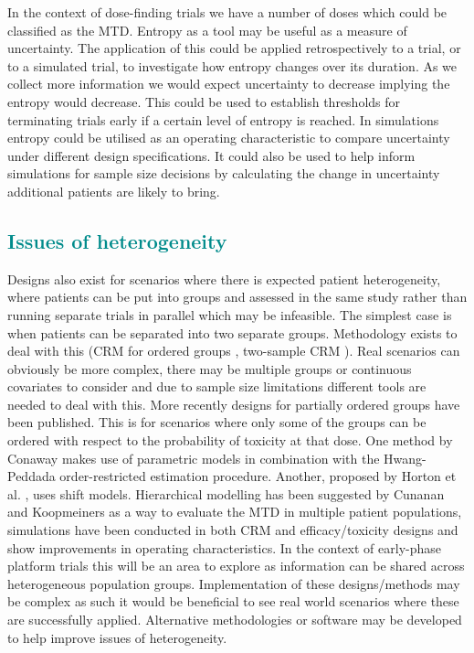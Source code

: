 \documentclass[a4paper, 11pt]{article} %
\begin{document}
\noindent In the context of dose-finding trials we have a number of doses which could be classified as the MTD. Entropy as a tool may be useful as a measure of uncertainty. The application of this could be applied retrospectively to a trial, or to a simulated trial, to investigate how entropy changes over its duration. As we collect more information we would expect uncertainty to decrease implying the entropy would decrease. This could be used to establish thresholds for terminating trials early if a certain level of entropy is reached. In simulations entropy could be utilised as an operating characteristic to compare uncertainty under different design specifications. It could also be used to help inform simulations for sample size decisions by calculating the change in uncertainty additional patients are likely to bring. 

\subsection{\textcolor{DarkCyan}{Issues of heterogeneity}}
Designs also exist for scenarios where there is expected patient heterogeneity, where patients can be put into groups and assessed in the same study rather than running separate trials in parallel which may be infeasible. The simplest case is when patients can be separated into two separate groups. Methodology exists to deal with this (CRM for ordered groups \cite{OQuigley2003}, two-sample CRM \cite{OQuigley1999}). Real scenarios can obviously be more complex, there may be multiple groups or continuous covariates to consider and due to sample size limitations different tools are needed to deal with this. More recently designs for partially ordered groups have been published. This is for scenarios where only some of the groups can be ordered with respect to the probability of toxicity at that dose. One method by Conaway \cite{Conaway2018} makes use of parametric models in combination with the Hwang-Peddada order-restricted estimation procedure. Another, proposed by Horton et al. \cite{Horton2019}, uses shift models. Hierarchical modelling has been suggested by Cunanan and Koopmeiners \cite{Cunanan2018, Cunanan2018a} as a way to evaluate the MTD in multiple patient populations, simulations have been conducted in both CRM \cite{Cunanan2018} and efficacy/toxicity \cite{Cunanan2018a} designs and show improvements in operating characteristics. In the context of early-phase platform trials this will be an area to explore as information can be shared across heterogeneous population groups. Implementation of these designs/methods may be complex as such it would be beneficial to see real world scenarios where these are successfully applied. Alternative methodologies or software may be developed to help improve issues of heterogeneity. 
\end{document}
